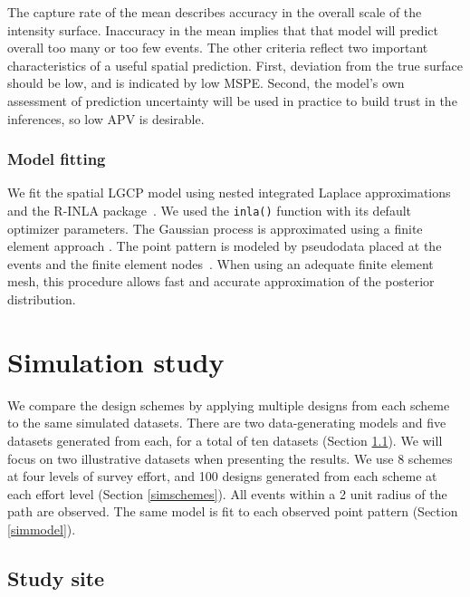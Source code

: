 \documentclass[review]{elsarticle}
\begin{document}
The capture rate of the mean describes accuracy in the overall scale of the
intensity surface. Inaccuracy in the mean implies that that model will predict
overall too many or too few events. The other criteria reflect two important
characteristics of a useful spatial prediction. First, deviation from the true
surface should be low, and is indicated by low MSPE. Second, the model's own
assessment of prediction uncertainty will be used in practice to build trust in
the inferences, so low APV is desirable. 


\subsubsection{Model fitting}

We fit the spatial LGCP model using nested integrated Laplace approximations
and the R-INLA package~\citep{rueetal,rinla}. We used the \texttt{inla()}
function with its default optimizer parameters. The Gaussian process is
approximated using a finite element approach \citep{lindgrenetal}. The point
pattern is modeled by pseudodata placed at the events and the finite element
nodes~\citep{simpsonetal}. When using an adequate finite element mesh, this
procedure allows fast and accurate approximation of the posterior
distribution.%


\section{Simulation study}

We compare the design schemes by applying multiple designs from each scheme
to the same simulated datasets. There are two data-generating models and five
datasets generated from each, for a total of ten datasets
(Section \ref{simsite}). We will focus on two illustrative datasets when
presenting the results. We use 8 schemes at four levels of survey effort, and
100 designs generated from each scheme at each effort level
(Section \ref{simschemes}). All events within a 2 unit radius of the path are
observed. The same model is fit to each observed point pattern
(Section \ref{simmodel}).



\subsection{Study site}
\label{simsite}
\end{document}
